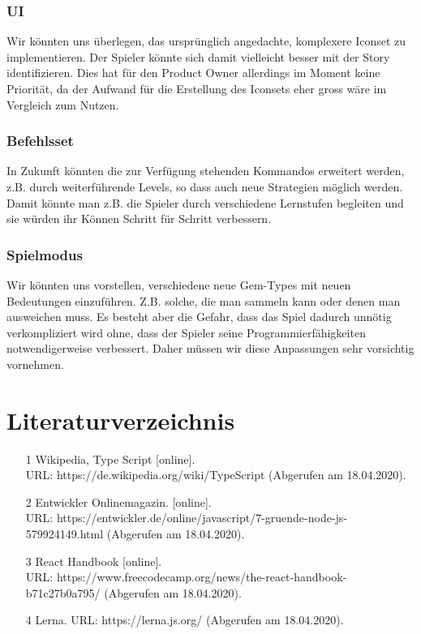 \documentclass[11pt,a4paper,titlepage]{article}
\begin{document}
\subsubsection{UI}
Wir könnten uns überlegen, das ursprünglich angedachte, komplexere Iconset zu implementieren. Der Spieler könnte sich damit vielleicht besser mit der Story identifizieren. Dies hat für den Product Owner allerdings im Moment keine Priorität, da der Aufwand für die Erstellung des Iconsets eher gross wäre im Vergleich zum Nutzen.

\subsubsection{Befehlsset}
In Zukunft könnten die zur Verfügung stehenden Kommandos erweitert werden, z.B. durch weiterführende Levels, so dass auch neue Strategien möglich werden. Damit könnte man z.B. die Spieler durch verschiedene Lernstufen begleiten und sie würden ihr Können Schritt für Schritt verbessern.

\subsubsection{Spielmodus}
Wir könnten uns vorstellen, verschiedene neue Gem-Types mit neuen Bedeutungen einzuführen. Z.B. solche, die man sammeln kann oder denen man ausweichen muss. Es besteht aber die Gefahr, dass das Spiel dadurch unnötig verkompliziert wird ohne, dass der Spieler seine Programmierfähigkeiten notwendigerweise verbessert. Daher müssen wir diese Anpassungen sehr vorsichtig vornehmen.

\newpage

\section{Literaturverzeichnis}

\begin{itemize}
\item [1] Wikipedia, Type Script [online]. \\URL: https://de.wikipedia.org/wiki/TypeScript (Abgerufen am 18.04.2020).
\item [2] Entwickler Onlinemagazin.  [online]. \\URL: https://entwickler.de/online/javascript/7-gruende-node-js-579924149.html (Abgerufen am 18.04.2020).
\item [3] React Handbook [online]. \\URL: https://www.freecodecamp.org/news/the-react-handbook-b71c27b0a795/ (Abgerufen am 18.04.2020).
\item [4] Lerna. URL: https://lerna.js.org/ (Abgerufen am 18.04.2020).
\end{itemize}
\begin{otherlanguage}{german}
\listoffigures
\end{otherlanguage}
\end{document}
